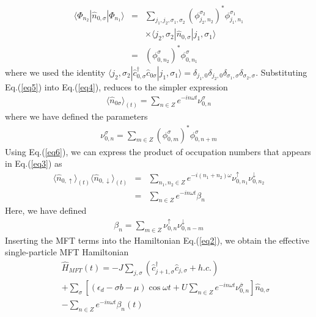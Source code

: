 \documentclass[aps,twocolumn,showpacs,floatfix,prl]{revtex4}
\begin{document}
\begin{eqnarray}
\langle \Phi_{n_2}^{}|
\hat{n}_{0,\sigma}|\Phi_{n_1}^{}\rangle &=&
 \sum_{j_1,j_2,\sigma_1,\sigma_2} \left(\phi_{j_2,n_2}^{\sigma_2}\right)^{*}\phi_{j_1,n_1}^{\sigma_1}\nonumber\\
&&\times \langle j_2,\sigma_2|\hat{n}_{0,\sigma}|j_1,\sigma_1\rangle\nonumber\\
&=& \left(\phi_{0,n_2}^{\sigma}\right)^{*}\phi_{0,n_1}^{\sigma}
\label{eq5}
\end{eqnarray}
where we used the identity $\langle j_2,\sigma_2|\hat{c}_{0,\sigma}^{\dagger}\hat{c}_{0\sigma}|j_1,\sigma_1\rangle = \delta_{j_1,0}\delta_{j_2,0}\delta_{\sigma_1,\sigma}\delta_{\sigma_2,\sigma}$. Substituting Eq.(\ref{eq5}) into
Eq.(\ref{eq4}), reduces to the simpler expression
\begin{eqnarray}
\langle \hat{n}_{0\sigma} \rangle_{(t)} = \sum_{n\in Z} e^{-i n \omega t} \nu_{0,n}^{\sigma}
\label{eq6}
\end{eqnarray}
where we have defined the parameters
\begin{eqnarray}
\nu_{0,n}^{\sigma} = \sum_{m\in Z} \left(\phi_{0,m}^{\sigma}\right)^{*}\phi_{0,n+m}^{\sigma}
\label{eq_nu}
\end{eqnarray}
Using Eq.(\ref{eq6}), we can express the product of occupation numbers that appears in Eq.(\ref{eq3}) as
\begin{eqnarray}
\langle \hat{n}_{0,\uparrow}\rangle_{(t)}\langle \hat{n}_{0,\downarrow}\rangle_{(t)} &=& \sum_{n_1,n_2 \in Z} e^{-i(n_1 + n_2)\omega}
\nu_{0,n_1}^{\uparrow}\nu_{0,n_2}^{\downarrow}\nonumber\\
&=&\sum_{n\in Z} e^{-i n \omega t} \beta_{n}^{}
\label{eq7} 
\end{eqnarray}
Here, we have defined
\begin{eqnarray}
\beta_{n}^{} = \sum_{m\in Z}\nu_{0,n}^{\uparrow}\nu_{0,n-m}^{\downarrow}
\label{eq_beta}
\end{eqnarray}
Inserting the MFT terms into the Hamiltonian Eq.(\ref{eq2}), we obtain the effective single-particle MFT Hamiltonian
\begin{eqnarray}
&&\hat{H}_{MFT}(t) =  -J\sum_{j,\sigma}\left( \hat{c}_{j+1,\sigma}^{\dagger}\hat{c}_{j,\sigma} + h.c.\right) \nonumber\\
&& + \sum_{\sigma}\left[\left(\epsilon_d -\sigma b  
- \mu\right)\cos\omega t  + U\sum_{n\in Z} e^{-i n \omega t}
\nu_{0,n}^{\bar{\sigma}}\right]
\hat{n}_{0,\sigma}\nonumber \\
& & -\sum_{n\in Z} e^{-i n \omega t}\beta_{n}^{}(t)
\nonumber\\
\label{eq_HMFT}
\end{eqnarray}
\end{document}
